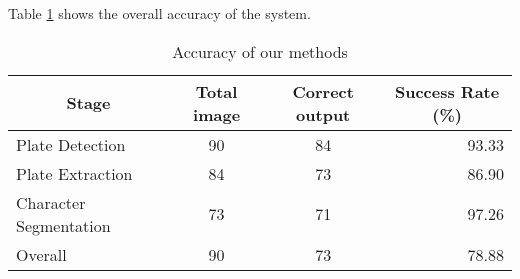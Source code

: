 Table \ref{tab:Accuracy1} shows the overall accuracy of the system.

\begin{table}[htb]
\centering
\caption{Accuracy of our methods}
\label{tab:Accuracy1}
\begin{tabular}{|l|c|c|r|}
    \hline 
    \multicolumn{1}{|c|}{Stage} & 
    \multicolumn{1}{|c|}{Total image} &
    \multicolumn{1}{|c|}{Correct output} &
    \multicolumn{1}{|c|}{Success Rate (\%)} \\
    \hline 
    Plate Detection & 90 & 84 & 93.33 \\ 
    Plate Extraction & 84 & 73 & 86.90 \\ 
    Character Segmentation & 73 & 71 & 97.26 \\
    \hline
    Overall & 90 & 73 & 78.88 \\
    \hline
\end{tabular}
\end{table}

